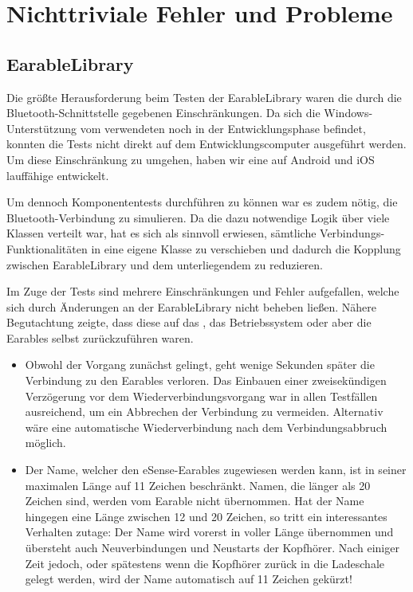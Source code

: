 \documentclass[../validierung.tex]{subfiles}
\begin{document}
\section{Nichttriviale Fehler und Probleme}
	\subsection{EarableLibrary}
		Die größte Herausforderung beim Testen der EarableLibrary waren die durch die Bluetooth-Schnittstelle gegebenen Einschränkungen.
		Da sich die Windows-Unterstützung vom verwendeten  noch in der Entwicklungsphase befindet,
		konnten die Tests nicht direkt auf dem Entwicklungscomputer ausgeführt werden.
		Um diese Einschränkung zu umgehen, haben wir eine auf Android und iOS lauffähige  entwickelt.

		Um dennoch Komponententests durchführen zu können war es zudem nötig, die Bluetooth-Verbindung zu simulieren.
		Da die dazu notwendige Logik über viele Klassen verteilt war, hat es sich als sinnvoll erwiesen, sämtliche Verbindungs-Funktionalitäten in eine
		eigene Klasse  zu verschieben und dadurch die Kopplung zwischen EarableLibrary und dem unterliegendem
		 zu reduzieren.

		Im Zuge der Tests sind mehrere Einschränkungen und Fehler aufgefallen, welche sich durch Änderungen an der EarableLibrary nicht beheben ließen.
		Nähere Begutachtung zeigte, dass diese auf das , das Betriebssystem oder aber die Earables selbst zurückzuführen waren.

		\begin{itemize}
			\item {}
			Obwohl der Vorgang
			zunächst gelingt, geht wenige Sekunden später die Verbindung zu den Earables verloren. Das Einbauen einer zweisekündigen Verzögerung vor dem
			Wiederverbindungsvorgang war in allen Testfällen ausreichend, um ein Abbrechen der Verbindung zu vermeiden.
			Alternativ wäre eine automatische Wiederverbindung nach dem Verbindungsabbruch möglich.
			\item Der Name, welcher den eSense-Earables zugewiesen werden kann, ist in seiner maximalen Länge auf 11 Zeichen beschränkt. Namen, die länger
			als 20 Zeichen sind, werden vom Earable nicht übernommen. Hat der Name hingegen eine Länge zwischen 12 und 20 Zeichen, so tritt ein
			interessantes Verhalten zutage: Der Name wird vorerst in voller Länge übernommen und übersteht auch Neuverbindungen und Neustarts der
			Kopfhörer. Nach einiger Zeit jedoch, oder spätestens wenn die Kopfhörer zurück in die Ladeschale gelegt werden, wird der Name automatisch auf
			11 Zeichen gekürzt!
		\end{itemize}
\end{document}
